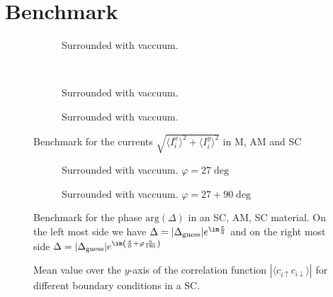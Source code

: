 \documentclass[../main.tex]{subfiles}
\begin{document}
\section{Benchmark}
\begin{figure}[H]
    \centering
    \begin{subfigure}{0.3\textwidth}
        \centering
        
        \caption{Surrounded with vaccuum.}
        \label{fig:first}
    \end{subfigure}\\
    \begin{subfigure}{0.45\textwidth}
        \centering
        
        \caption{Surrounded with vaccuum.}
        \label{fig:first}
    \end{subfigure}
    \hspace{0.1\textwidth}
    \begin{subfigure}{0.45\textwidth}
        \centering
        
        \caption{Surrounded with vaccuum.}
        \label{fig:first}
    \end{subfigure}
    \caption{Benchmark for the currents $\sqrt{\langle I^x_i\rangle^2 + \langle I^y_i\rangle^2}$ in M, AM and SC}
\end{figure}

\begin{figure}[H]
    \begin{subfigure}{0.4\textwidth}
        \centering
        \hspace{-4cm} %
        
        \caption{Surrounded with vaccuum. $\varphi = 27\deg$}
        \label{fig:first}
    \end{subfigure}    
    \hspace{0.1\textwidth}
    \begin{subfigure}{0.4\textwidth}
        \centering
        
        \caption{Surrounded with vaccuum. $\varphi = 27+90 \deg$}
        \label{fig:first}
    \end{subfigure}

    \caption{Benchmark for the phase $\text{arg}(\Delta)$ in an SC, AM, SC material. On the left most side we have $\Delta = |\Delta_{\text{guess}}|e^{\im \frac{\pi}{6}}$
    and on the right most side $\Delta = |\Delta_{\text{guess}}|e^{\im \left(\frac{\pi}{6} + \varphi\frac{\pi}{180}\right)}$}
\end{figure}
\begin{figure}[H]
    
    \caption{Mean value over the $y$-axis of the correlation function $|\langle c_{i\uparrow} c_{i\downarrow}\rangle|$ for different boundary conditions in a SC.}
\end{figure}
\end{document}
